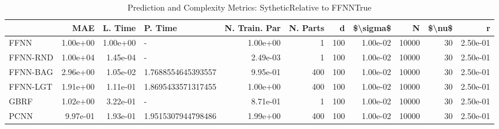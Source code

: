 \begin{table}
\centering
\caption{Prediction and Complexity Metrics: SytheticRelative to FFNNTrue}
\label{tab__Sythetic__Fix_Neurons_QTrue}
\begin{tabular}{lrrlrrrrrrr}
\toprule
{} &      MAE &  L. Time &             P. Time &  N. Train. Par &  N. Parts &    d &  \$\textbackslash sigma\$ &      N &  \$\textbackslash nu\$ &        r \\
\midrule
FFNN     & 1.00e+00 & 1.00e+00 &                   - &       1.00e+00 &         1 &  100 &  1.00e-02 &  10000 &     30 & 2.50e-01 \\
FFNN-RND & 1.00e+04 & 1.45e-04 &                   - &       2.49e-03 &         1 &  100 &  1.00e-02 &  10000 &     30 & 2.50e-01 \\
FFNN-BAG & 2.96e+00 & 1.05e-02 &  1.7688554645393557 &       9.95e-01 &       400 &  100 &  1.00e-02 &  10000 &     30 & 2.50e-01 \\
FFNN-LGT & 1.91e+00 & 1.11e-01 &  1.8695433571317455 &       1.00e+00 &       400 &  100 &  1.00e-02 &  10000 &     30 & 2.50e-01 \\
GBRF     & 1.02e+00 & 3.22e-01 &                   - &       8.71e-01 &         1 &  100 &  1.00e-02 &  10000 &     30 & 2.50e-01 \\
PCNN     & 9.97e-01 & 1.93e-01 &  1.9515307944798486 &       1.99e+00 &       400 &  100 &  1.00e-02 &  10000 &     30 & 2.50e-01 \\
\bottomrule
\end{tabular}
\end{table}
